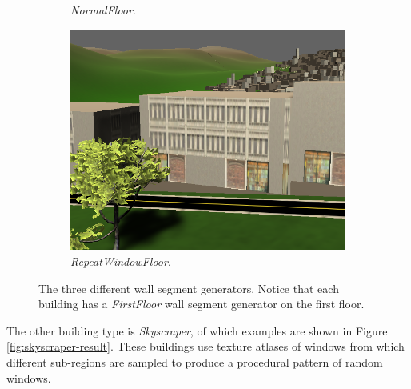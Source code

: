 \begin{figure}[H]
\begin{subfigure}[b]{0.3\textwidth}
    \caption{\textit{NormalFloor}.}
  \end{subfigure}
  \quad
  \begin{subfigure}[b]{0.3\textwidth}
      \includegraphics[width=\textwidth]{figure/building-only-window.PNG}
      \caption{\textit{RepeatWindowFloor}.}
  \end{subfigure}
  
  \caption{The three different wall segment generators. Notice that each building has a \textit{FirstFloor} wall segment generator on the first floor.}
  \label{fig:wall-segment-generator}
\end{figure}

The other building type is \textit{Skyscraper}, of which examples are shown in Figure \ref{fig:skyscraper-result}.
These buildings use texture atlases of windows from which different sub-regions are sampled to produce a procedural pattern of random windows.

